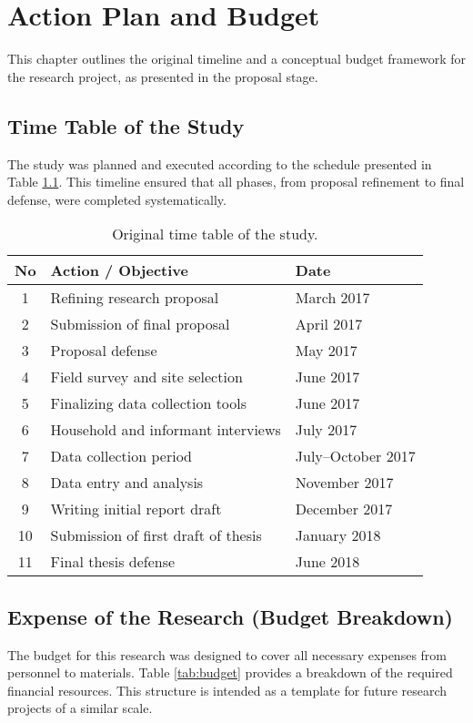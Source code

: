 
\chapter{Action Plan and Budget}
\label{chap:action_plan}

This chapter outlines the original timeline and a conceptual budget framework for the research project, as presented in the proposal stage.

\section{Time Table of the Study}
The study was planned and executed according to the schedule presented in Table \ref{tab:timetable}. This timeline ensured that all phases, from proposal refinement to final defense, were completed systematically.

\begin{table}[H]
    \centering
    \caption{Original time table of the study.}
    \label{tab:timetable}
    \begin{tabular}{@{}cll@{}}
    \toprule
    \textbf{No} & \textbf{Action / Objective} & \textbf{Date} \\ \midrule
    1 & Refining research proposal & March 2017 \\
    2 & Submission of final proposal & April 2017 \\
    3 & Proposal defense & May 2017 \\
    4 & Field survey and site selection & June 2017 \\
    5 & Finalizing data collection tools & June 2017 \\
    6 & Household and informant interviews & July 2017 \\
    7 & Data collection period & July--October 2017 \\
    8 & Data entry and analysis & November 2017 \\
    9 & Writing initial report draft & December 2017 \\
    10 & Submission of first draft of thesis & January 2018 \\
    11 & Final thesis defense & June 2018 \\ \bottomrule
    \end{tabular}
\end{table}

\section{Expense of the Research (Budget Breakdown)}
The budget for this research was designed to cover all necessary expenses from personnel to materials. Table \ref{tab:budget} provides a breakdown of the required financial resources. This structure is intended as a template for future research projects of a similar scale.

